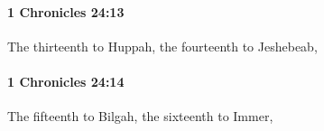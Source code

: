 		\paragraph{1 Chronicles 24:13} %
			\label{1CHRONICLES-24-13}

			The thirteenth to Huppah, the fourteenth to Jeshebeab,


		\paragraph{1 Chronicles 24:14} %
			\label{1CHRONICLES-24-14}

			The fifteenth to Bilgah, the sixteenth to Immer,


